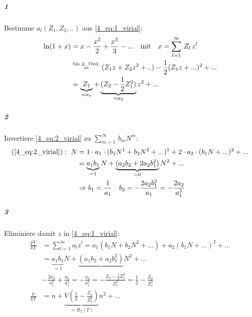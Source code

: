 \subparagraph{1} Bestimme $a_l(Z_1,Z_2,..)$ aus \cref{4_eq:1_virial}:
\begin{align}
    \ln(1+x) &= x - \frac{x^2}{2} + \frac{x^3}{3} -... \qq{mit} x = \sum_{l=1}^{\infty} \, Z_l \, z^l\\
    &\stackrel{\text{bis 2. Ord.}}{=} (Z_1z+Z_2 z^2+..) - \frac{1}{2} (Z_1 z+...)^2 +...\\
    &= \underbrace{Z_1}_{=a_1} + \underbrace{(Z_2 - \frac{1}{2}Z_1^2)}_{= a_2} z^2 + ...
\end{align}

\subparagraph{2} Invertiere \cref{4_eq:2_virial} zu $\sum_{m=1}^{\infty} \, b_m N^m$:
\begin{align}
    (\ref{4_eq:2_virial}): \ N &= 1\cdot a_1 \cdot (b_1N^1+b_2N^2+...)^1 + 2\cdot a_2 \cdot (b_1 N +...)^2 + ...\\
    &= \underbrace{a_1b_1}_{=1}N + \underbrace{(a_2b_2+2a_2b_1^2)}_{=0}N^2+...\\
    &\Rightarrow b_1 = \frac{1}{a_1} \quad b_2 = -\frac{2 a_2b_1^2}{a_1} = -\frac{2a_2}{a_1^3}
\end{align}

\subparagraph{3} Eliminiere damit $z$ in \cref{4_eq:1_virial}:
\begin{align}
    \frac{pV}{kT} &= \sum_{l=1}^{\infty} a_l z^l = a_1(b_1N+b_2N^2+...)+a_2(b_1N+...)^2+...\\
    &= \underbrace{a_1b_1}_{=1} N + \underbrace{(a_1b_2+a_2b_1^2)} N^2 + ...\\
    & - \frac{2a_2}{a_1^2} + \frac{a_2}{a_1^2} = -\frac{a_2}{a_1^2} = - \frac{Z_2 - \frac{1}{2}Z_1^2}{Z_1^2} = \frac{1}{2} - \frac{Z_2}{Z_1^2} \\
    \frac{p}{kT} &= n + \underbrace{V\left(\frac{1}{2}-\frac{Z_2}{Z_1^2}\right)}_{=B_2(T)} n^2+...
\end{align}

